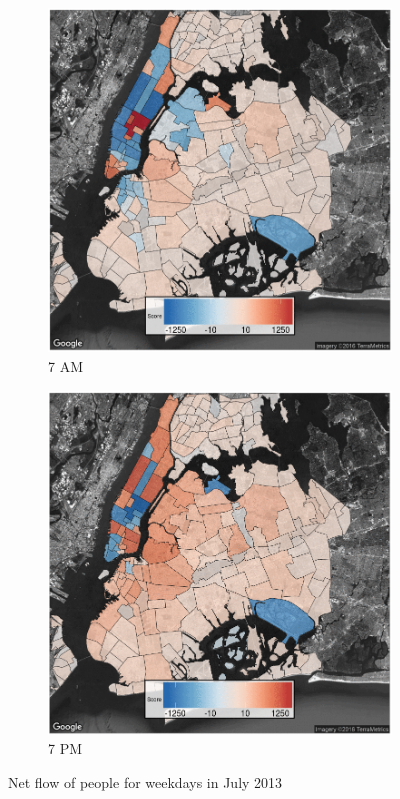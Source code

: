 \documentclass[twocolumn]{article}
\begin{document}
\begin{figure}[t]
\begin{subfigure}{0.24\textwidth}
\centering
 \includegraphics[width=1\linewidth]{7am} 
 \caption{7 AM}
 \label{fig:7am}
\end{subfigure}
 \begin{subfigure}{0.24\textwidth}
 \centering
\includegraphics[width=1\linewidth]{7pm}
 \caption{7 PM} 
 \label{fig:7pm}
\end{subfigure}
 
\caption{Net flow of people for weekdays in July 2013}
\label{fig:flow}
\end{figure}
\end{document}
